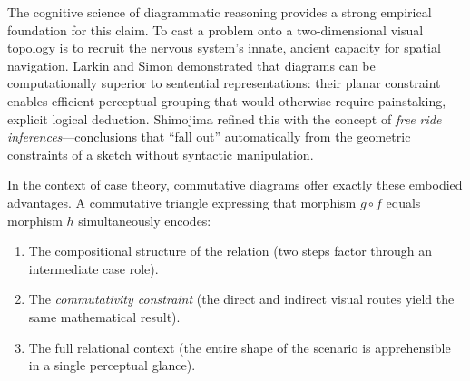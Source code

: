 \documentclass[
]{article}
\providecommand{\tightlist}{%
  \setlength{\itemsep}{0pt}\setlength{\parskip}{0pt}}
\begin{document}
The cognitive science of diagrammatic reasoning provides a strong
empirical foundation for this claim. To cast a problem onto a
two-dimensional visual topology is to recruit the nervous system's
innate, ancient capacity for spatial navigation. Larkin and Simon
\citeyearpar{larkin1987diagram} demonstrated that diagrams can be
computationally superior to sentential representations: their planar
constraint enables efficient perceptual grouping that would otherwise
require painstaking, explicit logical deduction. Shimojima
\citeyearpar{shimojima1996reasoning} refined this with the concept of
\emph{free ride inferences}---conclusions that ``fall out''
automatically from the geometric constraints of a sketch without
syntactic manipulation.

In the context of case theory, commutative diagrams offer exactly these
embodied advantages. A commutative triangle expressing that morphism
\(g \circ f\) equals morphism \(h\) simultaneously encodes:

\begin{enumerate}
\def\labelenumi{\arabic{enumi}.}
\tightlist
\item
  The compositional structure of the relation (two steps factor through
  an intermediate case role).
\item
  The \emph{commutativity constraint} (the direct and indirect visual
  routes yield the same mathematical result).
\item
  The full relational context (the entire shape of the scenario is
  apprehensible in a single perceptual glance).
\end{enumerate}
\end{document}
